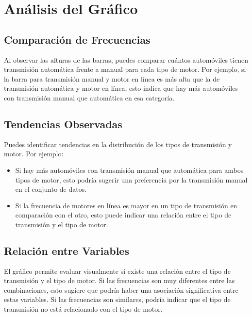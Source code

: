 \documentclass{article}
\begin{document}
\section{Análisis del Gráfico}

\subsection{Comparación de Frecuencias}
Al observar las alturas de las barras, puedes comparar cuántos automóviles tienen transmisión automática frente a manual para cada tipo de motor. Por ejemplo, si la barra para transmisión manual y motor en línea es más alta que la de transmisión automática y motor en línea, esto indica que hay más automóviles con transmisión manual que automática en esa categoría.

\subsection{Tendencias Observadas}
Puedes identificar tendencias en la distribución de los tipos de transmisión y motor. Por ejemplo:
\begin{itemize}
    \item Si hay más automóviles con transmisión manual que automática para ambos tipos de motor, esto podría sugerir una preferencia por la transmisión manual en el conjunto de datos.
    \item Si la frecuencia de motores en línea es mayor en un tipo de transmisión en comparación con el otro, esto puede indicar una relación entre el tipo de transmisión y el tipo de motor.
\end{itemize}

\subsection{Relación entre Variables}
El gráfico permite evaluar visualmente si existe una relación entre el tipo de transmisión y el tipo de motor. Si las frecuencias son muy diferentes entre las combinaciones, esto sugiere que podría haber una asociación significativa entre estas variables. Si las frecuencias son similares, podría indicar que el tipo de transmisión no está relacionado con el tipo de motor.
\end{document}
